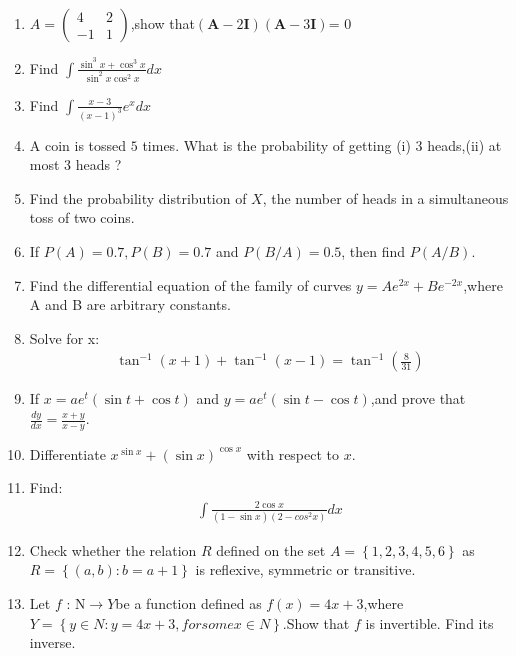 \documentclass[12pt,-letter paper]{article}
\providecommand{\brak}[1]{\ensuremath{\left(#1\right)}}
\providecommand{\cbrak}[1]{\ensuremath{\left\{#1\right\}}}
\theoremstyle{remark}
\newcommand{\myvec}[1]{\ensuremath{\begin{pmatrix}#1\end{pmatrix}}}
\let\vec\mathbf
\begin{document}
\begin{enumerate}
 \item $A= \myvec{4&2\\-1& 1}$,show that\brak{\vec{A}-2\vec{I}}\brak{\vec{A}-3\vec{I}}= 0
 
 \item Find $\int{\frac{\sin^3{x}+\cos^3{x}}{\sin^2{x}\cos^2{x}}}dx$
 
\item Find $\int{\frac{x-3}{\brak{x-1}^3}}e^x dx$

 \item A coin is tossed $5$ times. What is the probability of getting (i) $3$ heads,(ii) at most $3$ heads ?
 
\item Find the probability distribution of $X$, the number of heads in a simultaneous toss of two coins.

\item If $P(A)=0.7,P(B)=0.7$ and $P(B/A)=0.5$, then find $P(A/B)$.

\item Find the differential equation of the family of curves ${y}=Ae^{2x}+Be^{-2x}$,where A and B are arbitrary constants.

\item Solve for x:\begin{align*}\tan^{-1}\brak{x+1}+\tan^{-1}\brak{x-1}=\tan^{-1}\brak{\frac{8}{31}}\end{align*}

\item If ${x}=ae^t\brak{\sin{t}+\cos{t}}$ and ${y}=ae^t\brak{\sin{t}-\cos{t}}$,and prove that $\frac{dy}{dx}=\frac{x+y}{x-y}$.

\item Differentiate $x^{\sin x}+\brak{\sin x}^{\cos x}$ with respect to $x$.

\item Find: \begin{align*}\int{\frac{2\cos x}{\brak{1-\sin x}\brak{2-cos^2 x}}}dx\end{align*}  

\item Check whether the relation $R$ defined on the set $A=\cbrak{1,2,3,4,5,6}$ as $R =\cbrak {(a, b) : b = a + 1}$ is reflexive, symmetric or transitive.

\item Let $f$ : N$\rightarrow Y $be a function defined as $f\brak{x}= 4x + 3$,where $Y=\cbrak{y\in N :y=4x+3,for some x\in N}$.Show that $f$ is invertible. Find its inverse.


\end{enumerate}
\end{document}
